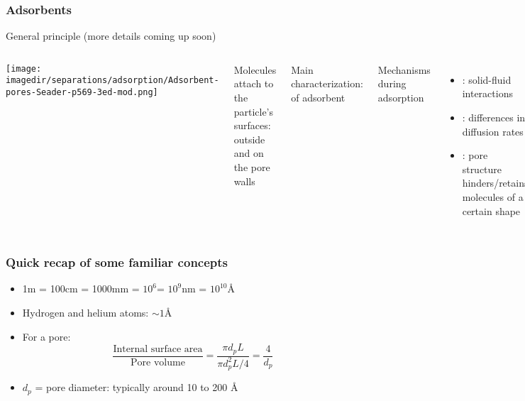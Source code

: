 \begin{frame}\frametitle{Adsorbents}
	General principle (more details coming up soon)
	\begin{columns}[c]
			\begin{center}
				\texttt{[image: \\imagedir/separations/adsorption/Adsorbent-pores-Seader-p569-3ed-mod.png]}
			\end{center}
			Molecules attach to the particle's surfaces: outside and on the pore walls

			\vspace{12pt}
			Main characterization: {\color{purple}{pore diameter}} of adsorbent

			\vspace{12pt}
			Mechanisms during adsorption
				\begin{itemize}
				\item	{\color{purple}{equilibrium interaction}}: solid-fluid interactions
				\item	{\color{purple}{kinetic}}: differences in diffusion rates
				\item	{\color{purple}{steric}}: pore structure hinders/retains molecules of a certain shape
			\end{itemize}
	\end{columns}
\end{frame}

\begin{frame}\frametitle{Quick recap of some familiar concepts}
	\begin{itemize}
		\item	1m = 100cm = 1000mm = $10^6$\micron = $10^9$nm = $10^{10}$\AA
		\item	Hydrogen and helium atoms: $\sim 1$\AA
		\item	For a pore: \[\frac{\text{Internal surface area}}{\text{Pore volume}} = \frac{\pi d_p L}{\pi d_p^2 L/4} = \frac{4}{d_p}\]
		\item	$d_p$ = pore diameter: typically around 10 to 200 \AA
	\end{itemize}
\end{frame}

